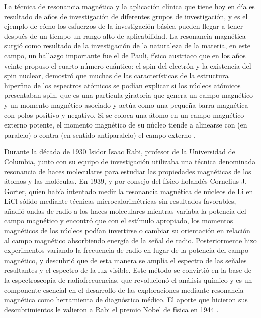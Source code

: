 
La técnica de  resonancia magnética y la aplicación clínica que tiene hoy en día es resultado de años de investigación de diferentes grupos de investigación, y es el ejemplo de cómo los esfuerzos de la investigación básica pueden llegar a tener después de un tiempo un rango alto de aplicabilidad.
La resonancia magnética surgió como resultado de la investigación de la naturaleza de la materia, en este campo, un hallazgo importante fue el de Pauli, físico austriaco que en los años veinte propuso el cuarto número cuántico: el spin del electrón y la existencia del spin nuclear, demostró que muchas de las características de la estructura hiperfina de los espectros atómicos se podían explicar si los núcleos atómicos presentaban spin, que es una partícula giratoria que genera un campo magnético y un momento magnético asociado y actúa como una pequeña barra magnética con polos positivo y negativo. Si se coloca una átomo en un campo magnético externo potente, el momento magnético de su núcleo tiende a alinearse con (en paralelo) o contra (en sentido antiparalelo) el campo externo \cite{Canals_2008}.

Durante la década de 1930 Isidor Isaac Rabi, profesor de la Universidad de Columbia, junto con su equipo de investigación utilizaba una técnica denominada resonancia de haces moleculares para estudiar las propiedades magnéticas de los átomos y las moléculas. En 1939, y por consejo  del físico holandés Cornelius J. Gorter,  quien había intentado medir la resonancia magnética de núcleos de Li en LiCl sólido mediante técnicas microcalorimétricas sin resultados favorables, añadió ondas de radio a los haces moleculares mientras variaba la potencia del campo magnético y encontró que con el estímulo apropiado, los momentos magnéticos de los núcleos podían invertirse o cambiar su orientación en relación al campo magnético absorbiendo energía de la señal de radio. Posteriormente hizo experimentos variando la frecuencia de radio en lugar de la potencia del campo magnético, y descubrió que de esta manera se amplía el espectro de las señales resultantes y el espectro de la luz visible. Este método se convirtió en la base de la espectroscopia de radiofrecuencias, que revolucionó el análisis químico y es un componente esencial en el desarrollo de las exploraciones mediante resonancia magnética como herramienta de diagnóstico médico. El aporte que hicieron sus descubrimientos le valieron a Rabi el premio Nobel de física en 1944 \cite{Shampo2012,Canals_2008}.

